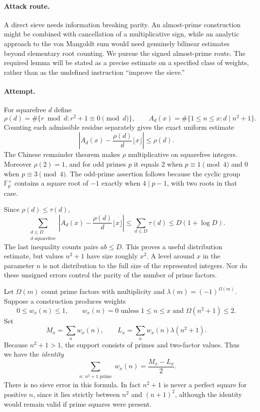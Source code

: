 \documentclass[11pt,a4paper]{article}
\newcommand{\F}{\mathbb{F}}
\numberwithin{equation}{section}
\begin{document}
\paragraph{Attack route.}
A direct sieve needs information breaking parity. An almost-prime construction might be combined with cancellation of a multiplicative sign, while an analytic approach to the von Mangoldt sum would need genuinely bilinear estimates beyond elementary root counting. We pursue the signed almost-prime route. The required lemma will be stated as a precise estimate on a specified class of weights, rather than as the undefined instruction ``improve the sieve.''

\paragraph{Attempt.}
For squarefree $d$ define
\[
 \rho(d)=\#\{r\bmod d:r^2+1\equiv0\pmod d\},\qquad
 A_d(x)=\#\{1\le n\le x:d\mid n^2+1\}.
\]
Counting each admissible residue separately gives the exact uniform estimate
\begin{equation}\label{eq190:local}
 \left|A_d(x)-\frac{\rho(d)}d\lfloor x\rfloor\right|\le\rho(d).
\end{equation}
The Chinese remainder theorem makes $\rho$ multiplicative on squarefree integers. Moreover $\rho(2)=1$, and for odd primes $p$ it equals $2$ when $p\equiv1\pmod4$ and $0$ when $p\equiv3\pmod4$. The odd-prime assertion follows because the cyclic group $\F_p^\times$ contains a square root of $-1$ exactly when $4\mid p-1$, with two roots in that case.

Since $\rho(d)\le\tau(d)$,
\[
 \sum_{\substack{d\le D\\d\text{ squarefree}}}
 \left|A_d(x)-\frac{\rho(d)}d\lfloor x\rfloor\right|
 \le\sum_{d\le D}\tau(d)
 \le D(1+\log D).
\]
The last inequality counts pairs $ab\le D$. This proves a useful distribution estimate, but values $n^2+1$ have size roughly $x^2$. A level around $x$ in the parameter $n$ is not distribution to the full size of the represented integers. Nor do these unsigned errors control the parity of the number of prime factors.

Let $\Omega(m)$ count prime factors with multiplicity and $\lambda(m)=(-1)^{\Omega(m)}$. Suppose a construction produces weights
\[
 0\le w_x(n)\le1,\qquad w_x(n)=0\text{ unless }1\le n\le x
 \text{ and }\Omega(n^2+1)\le2.
\]
Set
\[
 M_x=\sum_nw_x(n),\qquad
 L_x=\sum_nw_x(n)\lambda(n^2+1).
\]
Because $n^2+1>1$, the support consists of primes and two-factor values. Thus we have the \emph{identity}
\begin{equation}\label{eq190:parity}
 \sum_{\substack{n:\,n^2+1\text{ prime}}}w_x(n)=\frac{M_x-L_x}{2}.
\end{equation}
There is no sieve error in this formula. In fact $n^2+1$ is never a perfect square for positive $n$, since it lies strictly between $n^2$ and $(n+1)^2$, although the identity would remain valid if prime squares were present.
\end{document}

